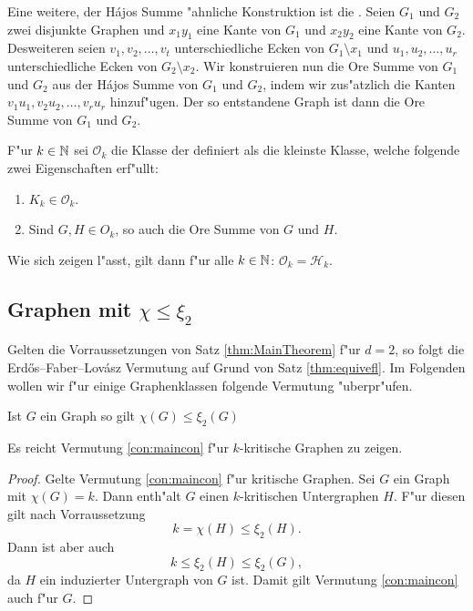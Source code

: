   Eine weitere, der H\'ajos Summe "ahnliche Konstruktion ist die  \cite{Ore67}. Seien $G_1$ und $G_2$ zwei disjunkte Graphen und $x_1y_1$ eine Kante von $G_1$ und $x_2y_2$ eine Kante von $G_2$. Desweiteren seien $v_1,v_2,\dots,v_t$ unterschiedliche Ecken von $G_1\setminus x_1$ und $u_1,u_2,\dots,u_r$ unterschiedliche Ecken von $G_2\setminus x_2$. Wir konstruieren nun die Ore Summe von $G_1$ und $G_2$ aus der H\'ajos Summe von $G_1$ und $G_2$, indem wir zus"atzlich die Kanten $v_1u_1,v_2u_2,\dots,v_ru_r$ hinzuf"ugen. Der so entstandene Graph ist dann die Ore Summe von $G_1$ und $G_2$. 

  F"ur $k\in {\mathbb{N}}$ sei $\mathcal{O}_k$ die Klasse der  definiert als die kleinste Klasse, welche folgende zwei Eigenschaften erf"ullt:
  \begin{enumerate}
    \item $K_k\in \mathcal{O}_k$.
    \item Sind $G,H\in O_k$, so auch die Ore Summe von $G$ und $H$.
  \end{enumerate}

  Wie sich zeigen l"asst, gilt dann f"ur alle $k\in{\mathbb{N}}$: $\mathcal{O}_k = \mathcal{H}_k$.

  \subsection{Graphen mit $\chi \leq \xi_{2}$}

  Gelten die Vorraussetzungen von Satz \ref{thm:MainTheorem} f"ur $d=2$, so folgt die Erd\H{o}s--Faber--Lov\'asz Vermutung auf Grund von Satz \ref{thm:equivefl}. Im Folgenden wollen wir f"ur einige Graphenklassen folgende Vermutung "uberpr"ufen.
  \begin{conjecture}
    Ist $G$ ein Graph so gilt $\chi(G) \leq \xi_{2}(G)$
    \label{con:maincon}
  \end{conjecture}

  \begin{remark}
    Es reicht Vermutung \ref{con:maincon} f"ur $k$-kritische Graphen zu zeigen. 
  \end{remark}

  \begin{proof}
    Gelte Vermutung \ref{con:maincon} f"ur kritische Graphen.
    Sei $G$ ein Graph mit $\chi(G) = k$. Dann enth"alt $G$ einen $k$-kritischen Untergraphen $H$. F"ur diesen gilt nach Vorraussetzung $$k= \chi(H) \leq \xi_{2}(H).$$ Dann ist aber auch $$k \leq \xi_{2}(H) \leq \xi_{2}(G) ,$$ da $H$ ein induzierter Untergraph von $G$ ist.  Damit gilt Vermutung \ref{con:maincon} auch f"ur $G$.
  \end{proof}

